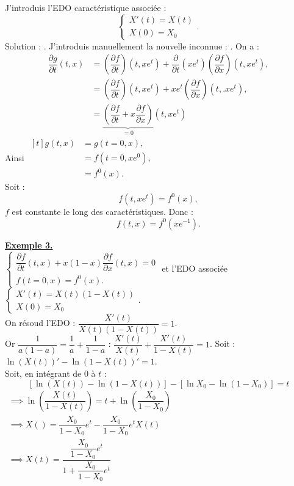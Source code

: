\documentclass[12pt,a4paper]{article}
\newcommand\diff[2]{\dfrac{\partial #1}{\partial #2}}
\begin{document}
	J'introduis l'EDO caractéristique associée :
	\begin{equation}
		\begin{cases}
			X'(t) = X(t)\\
			X(0) = X_0
		\end{cases}.
	\end{equation}
	Solution : . J'introduis manuellement la nouvelle inconnue : . On a :
	\[
	\begin{aligned}
		\diff gt(t,x) &= \left(\diff ft\right)(t,xe^t) + \diff{}t(xe^t)\left(\diff fx\right)(t,xe^t),\\
		&= \left(\diff ft\right)(t,xe^t) + xe^t \left(\diff fx\right)(t,.xe^t),\\
		&= \underbrace{\left(\diff ft + x\diff fx\right)}_{=0}(t,xe^t)
	\end{aligned}
	\]
	Ainsi $\begin{aligned}[t]
		g(t,x) &= g(t=0,x), \\
		&=f(t=0,xe^0),\\
		&=f^0(x).
	\end{aligned}$\\
	Soit :
	\begin{equation}
		f(t,xe^t) = f^0(x),
	\end{equation}
	$f$ est constante le long des caractéristiques. Donc :
	\begin{equation}
		f(t,x) = f^0(xe^{-1}).
	\end{equation}
	
	\large{\textbf{\underline{Exemple 3.}}}\\
	
	$\begin{cases}
		\diff ft(t,x) + x(1-x)\diff fx(t,x) = 0\\
		f(t=0,x) = f^0(x).
	\end{cases}$ et l'EDO associée $\begin{cases}
		X'(t) = X(t)(1-X(t))\\
		X(0) = X_0
	\end{cases}$.\\
	
	On résoud l'EDO : $\dfrac{X'(t)}{X(t)(1-X(t))} = 1$.\\
	Or $\dfrac1{a(1-a)} = \dfrac1a+\dfrac1{1-a}$ : $\dfrac{X'(t)}{X(t)} + \dfrac{X'(t)}{1-X(t)} = 1$. Soit : $\ln(X(t))' - \ln(1-X(t))' = 1$.\\
	Soit, en intégrant de 0 à $t$ : 
	\[
	\left[\ln(X(t)) - \ln(1-X(t))\right] - \left[\ln X_0 - \ln (1-X_0)\right] = t
	\] 
	$\begin{aligned}
		\implies \ln\left(\dfrac{X(t)}{1-X(t)}\right) = t + \ln\left(\dfrac{X_0}{1-X_0}\right)\\
		\implies X() = \dfrac{X_0}{1-X_0} e^t - \dfrac{X_0}{1-X_0} e^t X(t)\\
		\implies X(t) = \dfrac{\dfrac{X_0}{1-X_0}e^t}{1+\dfrac{X_0}{1-X_0}e^t}
	\end{aligned}$
	
\end{document}
